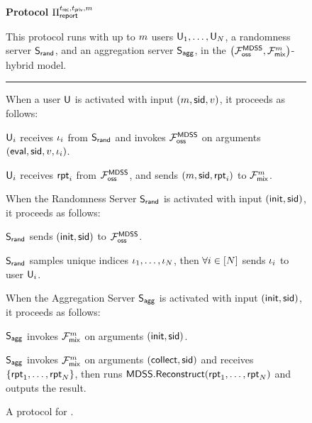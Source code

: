 \begin{figure}[h]
	\begin{center}
		\begin{techbox}
			\centerline{\textbf{Protocol} $\Pi_{\sf report}^{t_{\sf rec},t_{\sf priv}, m}$}

			This protocol runs with up to $m$ users $\mathsf{U}_{1},\dots,\mathsf{U}_{N}$, a randomness server $\mathsf{S}_{\mathsf{rand}}$, and an aggregation server $\mathsf{S}_{\mathsf{agg}}$, in the $\left(\mathcal{F}_{\sf oss}^{\sf MDSS}, \mathcal{F}_{\sf mix}^{m}\right)$-hybrid model.
			\vspace{1mm}
			\hrule
			\vspace{2mm}

			When a user $\mathsf{U}$ is activated with input $(m, {\sf sid}, v)$, it proceeds as follows:

			\begin{algenumerate}
				\item $\mathsf{U}_{i}$ receives $\iota_i$ from $\mathsf{S}_{\mathsf{rand}}$ and invokes $\mathcal{F}_{\sf oss}^{\sf MDSS}$ on arguments $({\sf eval}, {\sf sid}, v, \iota_i)$.
				\item $\mathsf{U}_{i}$ receives $\mathsf{rpt}_i$ from $\mathcal{F}_{\sf oss}^{\sf MDSS}$, and sends $(m, {\sf sid}, \mathsf{rpt}_i)$ to $\mathcal{F}_{\sf mix}^{m}$.
			\end{algenumerate}

			\vspace{2mm}
			When the Randomness Server $\mathsf{S}_{\mathsf{rand}}$ is activated with input $({\sf init}, {\sf sid})$, it proceeds as follows:

			\begin{algenumerate}
				\item $\mathsf{S}_{\mathsf{rand}}$ sends $({\sf init}, {\sf sid})$ to $\mathcal{F}_{\sf oss}^{\sf MDSS}$.
				\item $\mathsf{S}_{\mathsf{rand}}$ samples unique indices $\iota_1, \dots, \iota_{N}$, then $\forall i \in [N]$ sends $\iota_i$ to user $\mathsf{U}_i$.
			\end{algenumerate}

			\vspace{2mm}
			When the Aggregation Server $\mathsf{S}_{\mathsf{agg}}$ is activated with input $({\sf init}, {\sf sid})$, it proceeds as follows:

			\begin{algenumerate}
				\item $\mathsf{S}_{\mathsf{agg}}$ invokes $\mathcal{F}_{\sf mix}^{m}$ on arguments $({\sf init}, {\sf sid})$.
				\item $\mathsf{S}_{\mathsf{agg}}$ invokes $\mathcal{F}_{\sf mix}^{m}$ on arguments $({\sf collect}, {\sf sid})$ and receives $\{\mathsf{rpt}_1,\dots,\mathsf{rpt}_{N}\}$, then runs ${\sf MDSS}.{\sf Reconstruct}(\mathsf{rpt}_1,\dots,\mathsf{rpt}_{N})$ and outputs the result.
			\end{algenumerate}
		\end{techbox}
	\end{center}
	\caption{A protocol for \dopestar.}
	\label{fig:protocol_report}
\end{figure}
